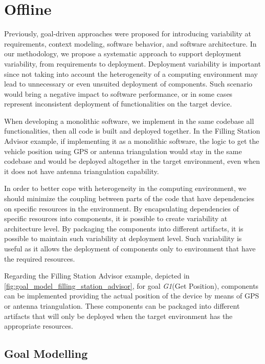\section{Offline}

Previously, goal-driven  approaches were proposed for introducing variability at requirements, context modeling, software behavior, and software architecture\cite{angelopoulos_capturing_2015}\cite{yu_goals_2008}.
In our methodology, we propose a systematic approach to support deployment variability, from requirements to deployment.
Deployment variability is important since not taking into account the heterogeneity of a computing environment may lead to unnecessary or even unsuited deployment of components.
Such scenario would bring a negative impact to software performance, or in some cases represent inconsistent deployment of functionalities on the target device.

When developing a monolithic software, we implement in the same codebase all functionalities, then all code is built and deployed together.
In the Filling Station Advisor example, if implementing it as a monolithic software, the logic to get the vehicle position using GPS or antenna triangulation would stay in the same codebase and would be deployed altogether in the target environment, even when it does not have antenna triangulation capability.


In order to better cope with heterogeneity in the computing environment, we should minimize the coupling between parts of the code that have dependencies on specific resources in the environment.
By encapsulating dependencies of specific resources into components, it is possible to create variability at architecture level. By packaging the components into different artifacts, it is possible to maintain such variability at deployment level. Such variability is useful as it allows the deployment of components only to environment that have the required resources.

Regarding the Filling Station Advisor example, depicted in \ref{fig:goal_model_filling_station_advisor}, for goal \emph{G1}(Get Position), components can be implemented providing the actual position of the device by means of GPS or antenna triangulation. These components can be packaged into different artifacts that will only be deployed when the target environment has the appropriate resources.

\subsection{Goal Modelling}
\label{sec:dgm}

